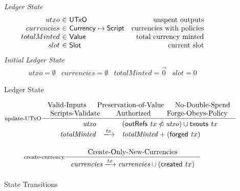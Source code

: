 \documentclass[11pt,a4paper]{article}
\newcommand{\restrictdom}{\lhd}
\newcommand{\subtractdom}{\mathbin{\slashed{\restrictdom}}}
\newcommand{\union}{\cup}
\newcommand{\var}[1]{\mathit{#1}}
\newcommand{\fun}[1]{\mathsf{#1}}
\newcommand{\type}[1]{\mathsf{#1}}
\newcommand{\trans}[2]{\xlongrightarrow[\textsc{#1}]{#2}}
\newcommand{\Slot}{\type{Slot}}
\newcommand{\Script}{\type{Script}}
\newcommand{\Currency}{\type{Currency}}
\newcommand{\Value}{\type{Value}}
\newcommand{\UTxO}{\type{UTxO}}
\newcommand{\txouts}[1]{\fun{txouts}\ \var{#1}}
\newcommand{\forged}[1]{\fun{forged}\ \var{#1}}
\newcommand{\created}[1]{\fun{created}\ \var{#1}}
\newcommand{\outRefs}[1]{\fun{outRefs}\ \var{#1}}
\begin{document}
\begin{figure}

\emph{Ledger State}
%
\begin{equation*}
\begin{array}{r@{~\in~}lr}
utxo & \UTxO & \text{unspent outputs}
\\
currencies & \Currency \mapsto \Script
  & \text{currencies with policies}
\\
totalMinted & \Value & \text{total currency minted}
\\
slot & \Slot & \text{current slot}

\end{array}
\end{equation*}
\emph{Initial Ledger State}
%
\begin{equation*}
\begin{array}{llllll}
utxo = \emptyset
  & currencies = \emptyset
  & totalMinted = \vec{0}
  & slot = 0
\end{array}
\end{equation*}

\caption{Ledger State}
\label{fig:ledger_state}
\end{figure}

\begin{figure}
  \centering
  \begin{equation}\label{eq:utxo-update}
    \inference[update-UTxO]
    {
      \text{Valid-Inputs} & \text{Preservation-of-Value} & \text{No-Double-Spend} \\
      \text{Scripts-Validate} & \text{Authorized} & \text{Forge-Obeys-Policy}
    }
    {
      \begin{array}{rcl}
        \var{utxo} & & (\outRefs tx \subtractdom \var{utxo}) \union \txouts tx \\
        \var{totalMinted} & \trans{}{tx} & \var{totalMinted} + (\forged tx)\\
      \end{array}
    }
  \end{equation}

  \begin{equation}\label{eq:create-currency}
    \inference[create-currency]
    {
      \text{Create-Only-New-Currencies}
    }
    {
      \var{currencies} \trans{}{tx} \var{currencies} \union (\created tx)
    }
  \end{equation}

  \caption{State Transitions}
  \label{fig:state_transition}
\end{figure}
\end{document}
